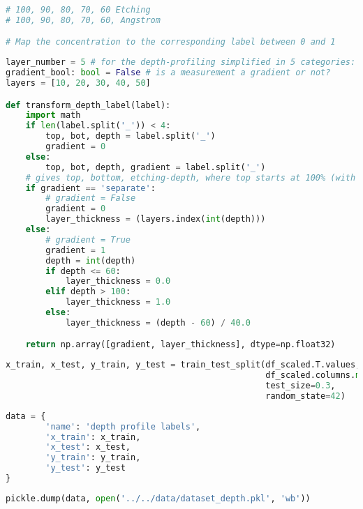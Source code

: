 \begin{lstlisting}[language=Python]
# 100, 90, 80, 70, 60 Etching
# 100, 90, 80, 70, 60, Angstrom

# Map the concentration to the corresponding label between 0 and 1
\end{lstlisting}

\begin{lstlisting}[language=Python]
layer_number = 5 # for the depth-profiling simplified in 5 categories: 0-10, 10-20, 20-30, 30-40, 40-50 Angstrom
gradient_bool: bool = False # is a measurement a gradient or not?
layers = [10, 20, 30, 40, 50]

def transform_depth_label(label):
    import math
    if len(label.split('_')) < 4:
        top, bot, depth = label.split('_')
        gradient = 0
    else:
        top, bot, depth, gradient = label.split('_')
    # gives top, bottom, etching-depth, where top starts at 100% (with 0 etching) on the top
    if gradient == 'separate':
        # gradient = False
        gradient = 0
        layer_thickness = (layers.index(int(depth)))
    else:
        # gradient = True
        gradient = 1
        depth = int(depth)
        if depth <= 60:
            layer_thickness = 0.0
        elif depth > 100:
            layer_thickness = 1.0
        else:
            layer_thickness = (depth - 60) / 40.0

    return np.array([gradient, layer_thickness], dtype=np.float32)
\end{lstlisting}

\begin{lstlisting}[language=Python]
x_train, x_test, y_train, y_test = train_test_split(df_scaled.T.values,
                                                    df_scaled.columns.map(lambda x: transform_depth_label(x)), # first part of the filename is the top label
                                                    test_size=0.3,
                                                    random_state=42)
\end{lstlisting}

\begin{lstlisting}[language=Python]
data = {
        'name': 'depth profile labels',
        'x_train': x_train,
        'x_test': x_test,
        'y_train': y_train,
        'y_test': y_test
}
\end{lstlisting}

\begin{lstlisting}[language=Python]
pickle.dump(data, open('../../data/dataset_depth.pkl', 'wb'))
\end{lstlisting}
